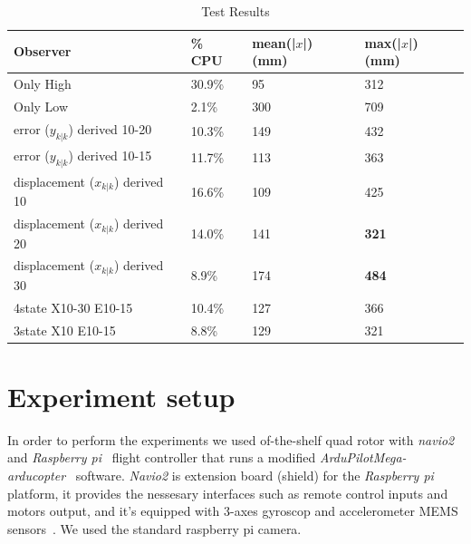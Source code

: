 \documentclass{sig-alternate-ipsn13}
\begin{document}
\begin{table}[htbp]
    \caption{Test Results}
    \begin{center}
        \begin{tabular}{m{8em} |  m{4em} m{5em} m{5em}}
            \hline
            \textbf{Observer}& \textbf{\% CPU}  & \textbf{mean(|$x$|) (mm)} & \textbf{max(|$x$|) (mm)}\\
            \hline
            Only High & 30.9\% & 95 & 312 \\
            \hline
            Only Low & 2.1\% & 300 & 709 \\
            \hline
            error ($y_{k|k}$) derived 10-20 & 10.3\% & 149 & 432 \\
            \hline
            error ($y_{k|k}$) derived 10-15 & 11.7\% & 113 & 363 \\
            \hline
            displacement ($x_{k|k}$) derived 10 & 16.6\% & 109 & 425 \\
            \hline
            displacement ($x_{k|k}$) derived 20 & 14.0\% & 141 & \textbf{321} \\
            \hline
            displacement ($x_{k|k}$) derived 30 & 8.9\% & 174 & \textbf{484} \\
            \hline
            4state X10-30 E10-15 & 10.4\% & 127 & 366 \\
            \hline
            3state X10 E10-15 & 8.8\% & 129 & 321 \\
            \hline
            
        \end{tabular}
        \label{tab1}
    \end{center}
\end{table}

\section{Experiment setup}
\label{sec:Experiment setup}

In order to perform the experiments we used of-the-shelf quad rotor with \textit{navio2}~\cite{navio} and \textit{Raspberry pi}~\cite{raspberry} flight controller that runs a modified \textit{ArduPilotMega-arducopter}~\cite{APM} software.
\textit{Navio2} is extension board (shield) for the \textit{Raspberry pi}~\cite{raspberry} platform, it provides the nessesary interfaces such as remote control inputs and motors output, and it's equipped with 3-axes gyroscop and accelerometer MEMS sensors~\cite{MEMS}.
We used the standard raspberry pi camera. %
\end{document}
